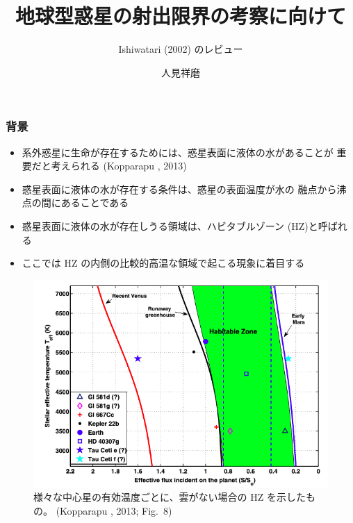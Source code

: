 \documentclass[aspectratio=149,9pt,fleqn]{beamer}
\institute{北海道大学大学院理学院 地球流体力学研究室 M2}
\author{人見祥磨}
\title{地球型惑星の射出限界の考察に向けて}
\subtitle{Ishiwatari \etal (2002) のレビュー}
\begin{document}
\maketitle

\begin{frame}
	\frametitle{背景}
	\begin{itemize}
		\item 系外惑星に生命が存在するためには、惑星表面に液体の水があることが
			重要だと考えられる (Kopparapu \etal*, 2013)
		\item 惑星表面に液体の水が存在する条件は、惑星の表面温度が水の
			融点から沸点の間にあることである
		\item 惑星表面に液体の水が存在しうる領域は、ハビタブルゾーン (HZ)と呼ばれる
		\item ここでは HZ の内側の比較的高温な領域で起こる現象に着目する
	\end{itemize}
	\begin{figure}
		\centering\scriptsize
		\includegraphics[width=.5\textwidth]{kopparapu8.png}\\
		様々な中心星の有効温度ごとに、雲がない場合の HZ を示したもの。
		(Kopparapu \etal*, 2013; Fig.\ 8)
	\end{figure}
\end{frame}
\end{document}
